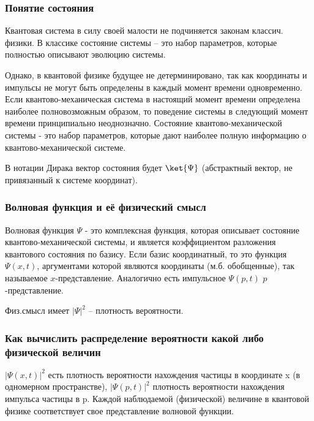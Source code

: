 
\subsubsection{Понятие состояния}\hypertarget{section}{}\label{section}

Квантовая система в силу своей малости не подчиняется законам классич. физики. В классике состояние системы -- это набор параметров, которые полностью описывают эволюцию системы.

Однако, в квантовой физике будущее не детерминировано, так как координаты и импульсы не могут быть определены в каждый момент времени одновременно. Если квантово-механическая система в настоящий момент времени определена наиболее полновозможным образом, то поведение системы в следующий момент времени принципиально неоднозначно. Состояние квантово-механической системы - это набор параметров, которые дают наиболее полную информацию о квантово-механической системе. 

В нотации Дирака вектор состояния будет $\ket{\Psi}$ (абстрактный вектор, не привязанный к системе координат). 


\subsubsection{Волновая функция и её физический смысл}\hypertarget{section-1}{}\label{section-1}

Волновая функция $\Psi$ - это комплексная функция, которая описывает состояние квантово-механической системы, и является коэффициентом разложения квантового состояния по базису. Если базис координатный, то это функция $\Psi(x,t)$, аргументами которой являются координаты (м.б. обобщенные), так называемое \guillemotleft{}$x$-представление\guillemotright{}. Аналогично есть импульсное $\Psi(p,t)$ $p$-представление. 

Физ.смысл имеет $|\Psi|^2$ -- плотность вероятности. 


\subsubsection{Как вычислить распределение вероятности какой либо физической величин}\hypertarget{section-2}{}\label{section-2}

$|\Psi(x,t)|^2$ есть плотность вероятности нахождения частицы в координате x (в одномерном пространстве), $|\Psi(p,t)|^2$  плотность вероятности нахождения импульса частицы в p. Каждой наблюдаемой (физической) величине в квантовой физике соответствует свое представление волновой функции. 


